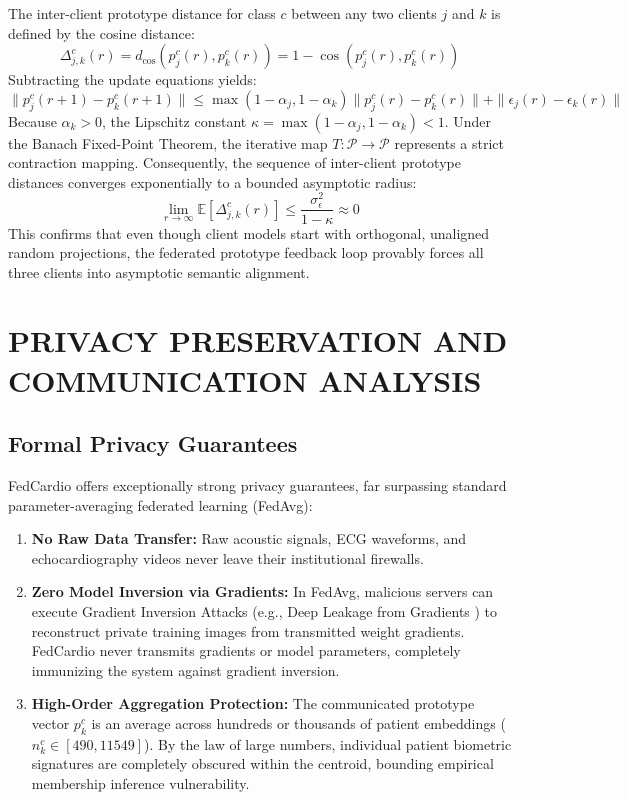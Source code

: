 \documentclass[12pt,a4paper]{amritareport}
\begin{document}
The inter-client prototype distance for class $c$ between any two clients $j$ and $k$ is defined by the cosine distance:
\begin{equation}
	\Delta_{j, k}^c(r) = d_{\cos}(p_j^c(r), p_k^c(r)) = 1 - \cos(p_j^c(r), p_k^c(r))
\end{equation}
Subtracting the update equations yields:
\begin{equation}
	\|p_j^c(r+1) - p_k^c(r+1)\| \leq \max(1-\alpha_j, 1-\alpha_k) \|p_j^c(r) - p_k^c(r)\| + \|\epsilon_j(r) - \epsilon_k(r)\|
\end{equation}
Because $\alpha_k > 0$, the Lipschitz constant $\kappa = \max(1-\alpha_j, 1-\alpha_k) < 1$. Under the Banach Fixed-Point Theorem, the iterative map $T: \mathcal{P} \rightarrow \mathcal{P}$ represents a strict contraction mapping. Consequently, the sequence of inter-client prototype distances converges exponentially to a bounded asymptotic radius:
\begin{equation}
	\lim_{r \rightarrow \infty} \mathbb{E}\left[\Delta_{j, k}^c(r)\right] \leq \frac{\sigma_\epsilon^2}{1 - \kappa} \approx 0
\end{equation}
This confirms that even though client models start with orthogonal, unaligned random projections, the federated prototype feedback loop provably forces all three clients into asymptotic semantic alignment.


\section{PRIVACY PRESERVATION AND COMMUNICATION ANALYSIS}

\subsection{Formal Privacy Guarantees}
FedCardio offers exceptionally strong privacy guarantees, far surpassing standard parameter-averaging federated learning (FedAvg):
\begin{enumerate}
	\item \textbf{No Raw Data Transfer:} Raw acoustic signals, ECG waveforms, and echocardiography videos never leave their institutional firewalls.
	\item \textbf{Zero Model Inversion via Gradients:} In FedAvg, malicious servers can execute Gradient Inversion Attacks (e.g., Deep Leakage from Gradients \cite{zhu2019deep}) to reconstruct private training images from transmitted weight gradients. FedCardio never transmits gradients or model parameters, completely immunizing the system against gradient inversion.
	\item \textbf{High-Order Aggregation Protection:} The communicated prototype vector $p_k^c$ is an average across hundreds or thousands of patient embeddings ($n_k^c \in [490, 11549]$). By the law of large numbers, individual patient biometric signatures are completely obscured within the centroid, bounding empirical membership inference vulnerability.
\end{enumerate}
\end{document}
